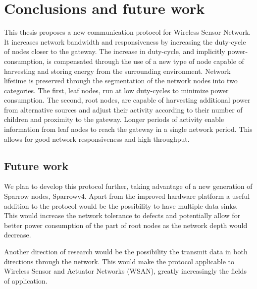 
\chapter{Conclusions and future work}

This thesis proposes a new communication protocol for Wireless Sensor Network.
It increases network bandwidth and responsiveness by increasing the duty-cycle
of nodes closer to the gateway. The increase in duty-cycle, and implicitly
power-consumption, is compensated through the use of a new type of node capable
of harvesting and storing energy from the surrounding environment.  Network
lifetime is preserved through the segmentation of the network nodes into two
categories. The first, leaf nodes, run at low duty-cycles to minimize power
consumption. The second, root nodes, are capable of harvesting additional power
from alternative sources and adjust their activity according to their number of
children and proximity to the gateway.  Longer periods of activity enable
information from leaf nodes to reach the gateway in a single network period.
This allows for good network responsiveness and high throughput.

\section{Future work}

We plan to develop this protocol further, taking advantage of a new generation
of Sparrow nodes, Sparrowv4. Apart from the improved hardware platform a useful
addition to the protocol would be the possibility to have multiple data sinks.
This would increase the network tolerance to defects and potentially allow for
better power consumption of the part of root nodes as the network depth would
decrease. 

Another direction of research would be the possibility the transmit data in
both directions through the network. This would make the protocol applicable to
Wireless Sensor and Actuator Networks (WSAN), greatly increasingly the fields
of application.

